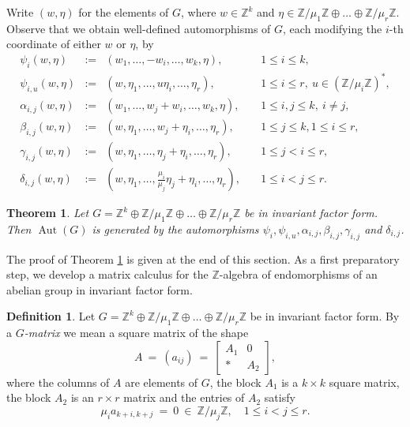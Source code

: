 \documentclass{amsart}
\DeclareMathOperator{\Aut}{Aut}
\newcommand{\Z}{\mathbb{Z}}
\newtheorem{theorem}[lem]{Theorem}
\theoremstyle{definition}
\newtheorem{definition}[lem]{Definition}
\begin{document}
Write $(w,\eta)$
for the elements of $G$, where $w \in \Z^k$ and
$\eta\in \Z/\mu_1\Z \oplus \ldots \oplus \Z/\mu_r\Z$.
Observe that we obtain well-defined automorphisms of $G$,
each modifying the $i$-th coordinate of either $w$ or $\eta$, by
\[
\begin{array}{lcll}  
\psi_i(w,\eta) & := & (w_1,\ldots,-w_i,\ldots,w_k,\eta), & \quad 1 \le i \le k,
\\[3pt]
\psi_{i,u}(w,\eta) & := & (w,\eta_1, \ldots, u\eta_i, \ldots, \eta_r), & \quad 1 \le i \le  r, \ u \in (\Z/\mu_i\Z)^*, 
\\[3pt]
\alpha_{i,j}(w,\eta) & := & (w_1,\ldots, w_j + w_i, \ldots, w_k,\eta), & \quad 1 \le i,j \le k, \ i \ne j,
\\[3pt]
\beta_{i,j}(w,\eta) & := & (w,\eta_1, \ldots, w_j + \eta_i, \ldots, \eta_r), & \quad 1 \le j \le k, 1 \le i \le r,
\\[3pt]
\gamma_{i,j}(w,\eta) & := & (w,\eta_1, \ldots, \eta_j + \eta_i, \ldots, \eta_r), & \quad 1 \le j < i \le r,
\\[3pt]
\delta_{i,j}(w,\eta) & := & (w,\eta_1, \ldots, \frac{\mu_i}{\mu_j}\eta_j + \eta_i, \ldots, \eta_r), & \quad 1 \le i < j \le r.
\end{array}
\] 

\begin{theorem}\label{isom theorem}
Let $G = \Z^k \oplus \Z/\mu_1\Z \oplus \ldots \oplus \Z/\mu_r\Z$ be in invariant factor form.
Then $\Aut(G)$ is generated by the automorphisms
$\psi_i, \psi_{i,u}, \alpha_{i,j}, \beta_{i,j}, \gamma_{i,j}$ and $\delta_{i,j}$.
\end{theorem}

The proof of Theorem \ref{isom theorem} is given at the end of this section.
As a first preparatory step, we develop a matrix calculus for the $\Z$-algebra of endomorphisms
of an abelian group in invariant factor form.

\begin{definition}
\label{def:gmatrix}
Let $G = \Z^k \oplus \Z/\mu_1\Z \oplus \ldots \oplus \Z/\mu_r\Z$ be in invariant factor form.
By a \emph{$G$-matrix} we mean a square matrix of the shape
\[
A \ = \ \left(a_{ij}\right) \ = \ \begin{bmatrix} A_1 & 0 \\ \ast & A_2 \end{bmatrix},
\]
where the columns of $A$ are elements of $G$, the block $A_1$ is a $k \times k$ square matrix,
the block $A_2$ is an $r \times r$ matrix and the entries of $A_2$ satisfy
\[
\mu_i a_{k+i,k+j} \ = \ 0 \ \in \ \Z/\mu_j\Z, \quad 1\leq i<j\leq r.
\]
\end{definition}
\end{document}
